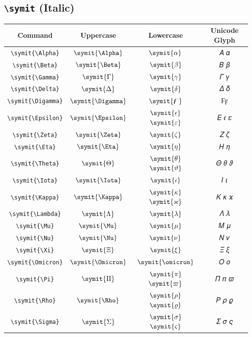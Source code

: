 \documentclass[12pt,a4paper]{article}
\begin{document}
\newpage

\subsection*{\texttt{\textbackslash{}symit} (Italic)}

\begin{longtable}{|c|c|c|c|}
\hline
\textbf{Command} & \textbf{Uppercase} & \textbf{Lowercase} & \textbf{Unicode Glyph} \\
\hline
\verb|\symit{\Alpha}| & $\symit{\Alpha}$ & $\symit{\alpha}$ & 𝛢 𝛼 \\
\verb|\symit{\Beta}| & $\symit{\Beta}$ & $\symit{\beta}$ & 𝛣 𝛽 \\
\verb|\symit{\Gamma}| & $\symit{\Gamma}$ & $\symit{\gamma}$ & 𝛤 𝛾 \\
\verb|\symit{\Delta}| & $\symit{\Delta}$ & $\symit{\delta}$ & 𝛥 𝛿 \\
\verb|\symit{\Digamma}| & $\symit{\Digamma}$ & $\symit{\digamma}$ & $ Ϝ ϝ $ \\
\verb|\symit{\Epsilon}| & $\symit{\Epsilon}$ & $\symit{\epsilon}$ $\symit{\varepsilon}$ & 𝛦 𝜖 𝜀 \\
\verb|\symit{\Zeta}| & $\symit{\Zeta}$ & $\symit{\zeta}$ & 𝛧 𝜁 \\
\verb|\symit{\Eta}| & $\symit{\Eta}$ & $\symit{\eta}$ & 𝛨 𝜂 \\
\verb|\symit{\Theta}| & $\symit{\Theta}$ & $\symit{\theta}$ $\symit{\vartheta}$ & 𝛩 𝜃 𝜗 \\
\verb|\symit{\Iota}| & $\symit{\Iota}$ & $\symit{\iota}$ & 𝛪 𝜄 \\
\verb|\symit{\Kappa}| & $\symit{\Kappa}$ & $\symit{\kappa}$ $\symit{\varkappa}$ & 𝛫 𝜅 𝜘 \\
\verb|\symit{\Lambda}| & $\symit{\Lambda}$ & $\symit{\lambda}$ & 𝛬 𝜆 \\
\verb|\symit{\Mu}| & $\symit{\Mu}$ & $\symit{\mu}$ & 𝛭 𝜇 \\
\verb|\symit{\Nu}| & $\symit{\Nu}$ & $\symit{\nu}$ & 𝛮 𝜈 \\
\verb|\symit{\Xi}| & $\symit{\Xi}$ & $\symit{\xi}$ & 𝛯 𝜉 \\
\verb|\symit{\Omicron}| & $\symit{\Omicron}$ & $\symit{\omicron}$ & 𝛰 𝜊 \\
\verb|\symit{\Pi}| & $\symit{\Pi}$ & $\symit{\pi}$ $\symit{\varpi}$ & 𝛱 𝜋 𝜛 \\
\verb|\symit{\Rho}| & $\symit{\Rho}$ & $\symit{\rho}$ $\symit{\varrho}$ & 𝛲 𝜌 𝜚 \\
\verb|\symit{\Sigma}| & $\symit{\Sigma}$ & $\symit{\sigma}$ $\symit{\varsigma}$ & 𝛴 𝜎 𝜍 \\

\end{longtable}
\end{document}
